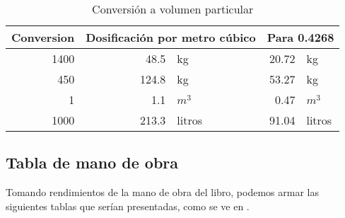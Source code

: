 \documentclass[../main.tex]{subfiles}
\begin{document}
\begin{table}[ht]
  \centering
  \caption{Conversión a volumen particular}
    \begin{tabular}{|r|rl|rl|}
    \hline
    \multicolumn{1}{|l|}{Conversion} & \multicolumn{2}{c|}{Dosificación por metro cúbico} & \multicolumn{2}{c|}{Para 0.4268} \bigstrut\\
    \hline
    1400  & 48.5  & kg    & 20.72 & kg \bigstrut\\
\cline{1-1}    450   & 124.8 & kg    & 53.27 & kg \bigstrut\\
\cline{1-1}    1     & 1.1   & $m^3$ & 0.47  & $m^3$ \bigstrut\\
\cline{1-1}    1000  & 213.3 & litros & 91.04 & litros \bigstrut\\
    \hline
    \end{tabular}%
  \label{tab:tablaparticular}%
\end{table}%


\subsection{Tabla de mano de obra}

Tomando rendimientos de la mano de obra del libro, podemos armar las siguientes
tablas que serían presentadas, como se ve en .
\end{document}
